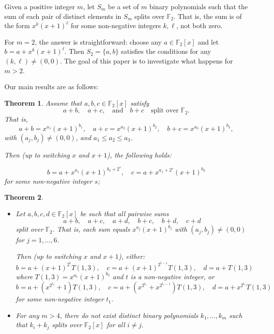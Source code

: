 \documentclass[12pt, reqno]{article}
\theoremstyle{plain}
\newtheorem{theorem}{Theorem}
\theoremstyle{definition}
\theoremstyle{remark}
\def\F{\mathbb{F}}
\begin{document}
Given a positive integer $m$, let $S_m$ be a set of $m$ binary polynomials such that the sum of each pair of distinct elements in $S_m$ splits over $\F_2$. That is, the sum is of the form $x^k(x+1)^\ell$ for some non-negative integers $k, \ell$, not both zero.

For $m = 2$, the answer is straightforward: choose any $a \in \F_2[x]$ and let $b = a + x^k(x+1)^\ell$. Then $S_2 = \{a, b\}$ satisfies the conditions for any $(k, \ell) \neq (0, 0)$. The goal of this paper is to investigate what happens for $m > 2$.

Our main results are as follows:

\begin{theorem}
\label{Nsedaka}
Assume that $a, b, c \in \F_2[x]$ satisfy
\begin{equation}
\label{tres}
a + b, \quad a + c, \quad \text{and} \quad b + c \quad \text{split over } \F_2.
\end{equation}
That is, 
\[
a + b = x^{a_1}(x+1)^{b_1}, \quad 
a + c = x^{a_2}(x+1)^{b_2}, \quad 
b + c = x^{a_3}(x+1)^{b_3},
\]
with $(a_j, b_j) \neq (0, 0)$, and $a_1 \leq a_2 \leq a_3$.

Then (up to switching $x$ and $x+1$), the following holds:
 
\begin{equation}
\label{Rtres1}
b = a + x^{a_1}(x+1)^{b_2 + 2^s}, \quad 
c = a + x^{a_1+2^s}(x+1)^{b_2}
\end{equation}
for some non-negative integer $s$;

\end{theorem}
 
\begin{theorem}
\label{Nsedaka1}
\begin{itemize}
\item[{\rm (i)}]
Let $a, b, c, d \in \F_2[x]$ be such that all pairwise sums
\[
a + b, \quad a + c, \quad a + d, \quad b + c, \quad b + d, \quad c + d
\]
split over $\F_2$. That is, each sum equals $x^{a_j}(x+1)^{b_j}$ with $(a_j, b_j) \neq (0, 0)$ for $j = 1, \dots, 6$.

Then (up to switching $x$ and $x+1$), either:
\begin{equation}
\label{Rtres21}
b = a + (x+1)^{2^t} T(1,3), \quad 
c = a + (x+1)^{2^{t-1}} T(1,3), \quad 
d = a + T(1,3)
\end{equation}
where $T(1,3) = x^{a_1}(x+1)^{b_3}$ and $t$ is a non-negative integer, or
\begin{equation}
\label{Rtres22}
b = a + (x^{2^{t_1}} + 1) T(1,3), \quad 
c = a + (x^{2^{t_1}} + x^{2^{t_1 - 1}}) T(1,3), \quad 
d = a + x^{2^{t_1}} T(1,3)
\end{equation}
for some non-negative integer $t_1$.

\item[{\rm (ii)}]
For any $m > 4$, there do not exist distinct binary polynomials $k_1, \dots, k_m$ such that $k_i + k_j$ splits over $\F_2[x]$ for all $i \ne j$.
\end{itemize}
\end{theorem}
\end{document}
